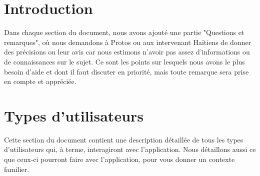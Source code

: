 \documentclass[a4paper, 11pt]{article}
\begin{document}
\section{Introduction}
Dans chaque section du document, nous avons ajouté une partie "Questions et remarques", où nous demandons à Protos ou aux intervenant Haïtiens de donner des précisions ou leur avis car nous estimons n'avoir pas assez d'informations ou de connaissances sur le sujet. Ce sont les points sur lesquels nous avons le plus besoin d'aide et dont il faut discuter en priorité, mais toute remarque sera prise en compte et appréciée.
\section{Types d'utilisateurs}
Cette section du document contient une description détaillée de tous les types d'utilisateurs qui, à terme, interagiront avec l'application. Nous détaillons aussi ce que ceux-ci pourront faire avec l'application, pour vous donner un contexte familier.
\end{document}
